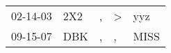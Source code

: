 \begin{supertabular}{lllll}
 02-14-03 &  2X2 &  , &  \textgreater &   yyz \\
 09-15-07 &  DBK &  , &             , &  MISS \\
\end{supertabular}
